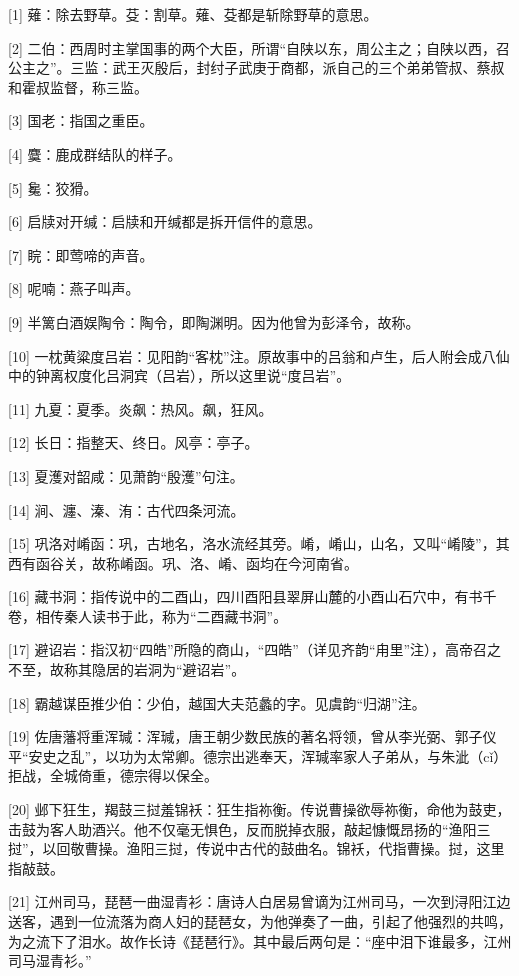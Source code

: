 \documentclass[12pt,UTF8]{ctexbook}
\begin{document}
[1] 薙：除去野草。芟：割草。薙、芟都是斩除野草的意思。

[2] 二伯：西周时主掌国事的两个大臣，所谓“自陕以东，周公主之；自陕以西，召公主之”。三监：武王灭殷后，封纣子武庚于商都，派自己的三个弟弟管叔、蔡叔和霍叔监督，称三监。

[3] 国老：指国之重臣。

[4] 麌：鹿成群结队的样子。

[5] 毚：狡猾。

[6] 启牍对开缄：启牍和开缄都是拆开信件的意思。

[7] 睆：即莺啼的声音。

[8] 呢喃：燕子叫声。

[9] 半篱白酒娱陶令：陶令，即陶渊明。因为他曾为彭泽令，故称。

[10] 一枕黄粱度吕岩：见阳韵“客枕”注。原故事中的吕翁和卢生，后人附会成八仙中的钟离权度化吕洞宾（吕岩），所以这里说“度吕岩”。

[11] 九夏：夏季。炎飙：热风。飙，狂风。

[12] 长日：指整天、终日。风亭：亭子。

[13] 夏濩对韶咸：见萧韵“殷濩”句注。

[14] 涧、瀍、溱、洧：古代四条河流。

[15] 巩洛对崤函：巩，古地名，洛水流经其旁。崤，崤山，山名，又叫“崤陵”，其西有函谷关，故称崤函。巩、洛、崤、函均在今河南省。

[16] 藏书洞：指传说中的二酉山，四川酉阳县翠屏山麓的小酉山石穴中，有书千卷，相传秦人读书于此，称为“二酉藏书洞”。

[17] 避诏岩：指汉初“四皓”所隐的商山，“四皓”（详见齐韵“甪里”注），高帝召之不至，故称其隐居的岩洞为“避诏岩”。

[18] 霸越谋臣推少伯：少伯，越国大夫范蠡的字。见虞韵“归湖”注。

[19] 佐唐藩将重浑瑊：浑瑊，唐王朝少数民族的著名将领，曾从李光弼、郭子仪平“安史之乱”，以功为太常卿。德宗出逃奉天，浑瑊率家人子弟从，与朱泚（cǐ）拒战，全城倚重，德宗得以保全。

[20] 邺下狂生，羯鼓三挝羞锦袄：狂生指祢衡。传说曹操欲辱祢衡，命他为鼓吏，击鼓为客人助酒兴。他不仅毫无惧色，反而脱掉衣服，敲起慷慨昂扬的“渔阳三挝”，以回敬曹操。渔阳三挝，传说中古代的鼓曲名。锦袄，代指曹操。挝，这里指敲鼓。

[21] 江州司马，琵琶一曲湿青衫：唐诗人白居易曾谪为江州司马，一次到浔阳江边送客，遇到一位流落为商人妇的琵琶女，为他弹奏了一曲，引起了他强烈的共鸣，为之流下了泪水。故作长诗《琵琶行》。其中最后两句是：“座中泪下谁最多，江州司马湿青衫。”
\end{document}
